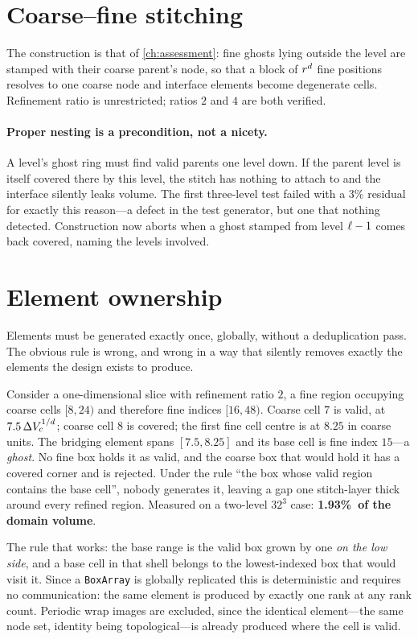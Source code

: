 \section{Coarse--fine stitching}
\label{sec:stitch}

The construction is that of \cref{ch:assessment}: fine ghosts lying outside the
level are stamped with their coarse parent's node, so that a block of
$r^{d}$ fine positions resolves to one coarse node and interface elements
become degenerate cells. Refinement ratio is unrestricted; ratios $2$ and $4$
are both verified.

\paragraph{Proper nesting is a precondition, not a nicety.}
A level's ghost ring must find valid parents one level down. If the parent level
is itself covered there by this level, the stitch has nothing to attach to and
the interface silently leaks volume. The first three-level test failed with a
$3\%$ residual for exactly this reason---a defect in the test generator, but one
that nothing detected. Construction now aborts when a ghost stamped from level
$\ell-1$ comes back covered, naming the levels involved.

\section{Element ownership}
\label{sec:ownership}

Elements must be generated exactly once, globally, without a deduplication
pass. The obvious rule is wrong, and wrong in a way that silently removes
exactly the elements the design exists to produce.

Consider a one-dimensional slice with refinement ratio $2$, a fine region
occupying coarse cells $[8,24)$ and therefore fine indices $[16,48)$. Coarse
cell $7$ is valid, at $7.5\,\Delta V_c^{1/d}$; coarse cell $8$ is covered; the
first fine cell centre is at $8.25$ in coarse units. The bridging element spans
$[7.5, 8.25]$ and its base cell is fine index $15$---a \emph{ghost}. No fine
box holds it as valid, and the coarse box that would hold it has a covered
corner and is rejected. Under the rule ``the box whose valid region contains the
base cell'', nobody generates it, leaving a gap one stitch-layer thick around
every refined region. Measured on a two-level $32^3$ case: \textbf{1.93\%\ of
the domain volume}.

The rule that works: the base range is the valid box grown by one \emph{on the
low side}, and a base cell in that shell belongs to the lowest-indexed box that
would visit it. Since a \texttt{BoxArray} is globally replicated this is
deterministic and requires no communication: the same element is produced by
exactly one rank at any rank count. Periodic wrap images are excluded, since the
identical element---the same node set, identity being topological---is already
produced where the cell is valid.

